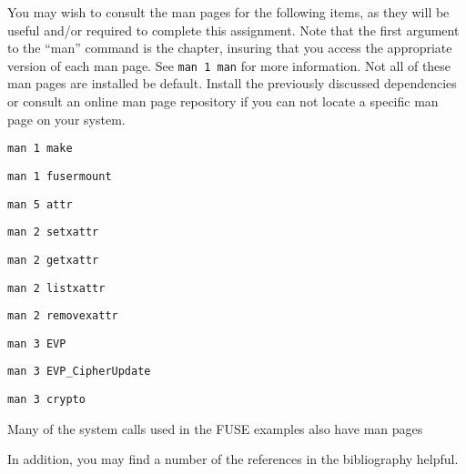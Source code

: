 \documentclass[12pt]{article}
\newenvironment{packed_item}{
\begin{itemize}
  \setlength{\itemsep}{1pt}
  \setlength{\parskip}{0pt}
  \setlength{\parsep}{0pt}
}{\end{itemize}}
\begin{document}
You may wish to consult the man pages for the following items, as they
will be useful and/or required to complete this assignment. Note that
the first argument to the ``man'' command is the chapter, insuring
that you access the appropriate version of each man page. See
\texttt{man 1 man} for more information. Not all of these man pages are
installed be default. Install the previously discussed dependencies or
consult an online man page repository if you can not locate a specific
man page on your system.

\begin{packed_item}
\item \texttt{man 1 make}
\item \texttt{man 1 fusermount}
\item \texttt{man 5 attr}
\item \texttt{man 2 setxattr}
\item \texttt{man 2 getxattr}
\item \texttt{man 2 listxattr}
\item \texttt{man 2 removexattr}
\item \texttt{man 3 EVP}
\item \texttt{man 3 EVP\_CipherUpdate}
\item \texttt{man 3 crypto}
\item Many of the system calls used in the FUSE examples also have man pages
\end{packed_item}

In addition, you may find a number of the references in the bibliography helpful.
\end{document}

